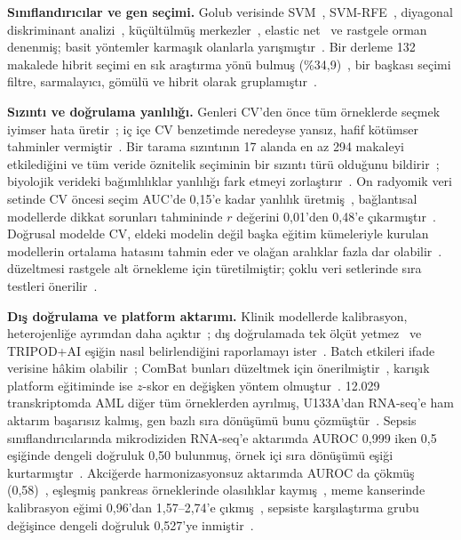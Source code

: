 \documentclass[conference]{IEEEtran}
\begin{document}
\textbf{Sınıflandırıcılar ve gen seçimi.} Golub verisinde SVM~\cite{furey2000}, SVM-RFE~\cite{guyon2002},
diyagonal diskriminant analizi~\cite{dudoit2002}, küçültülmüş merkezler~\cite{tibshirani2002}, elastic
net~\cite{zou2005} ve rastgele orman~\cite{diazuriarte2006} denenmiş; basit yöntemler karmaşık
olanlarla yarışmıştır~\cite{dudoit2002}. Bir derleme 132 makalede hibrit seçimi en sık araştırma yönü
bulmuş (\%34,9)~\cite{alhenawi2022}, bir başkası seçimi filtre, sarmalayıcı, gömülü ve hibrit olarak
gruplamıştır~\cite{alharbi2023}.

\textbf{Sızıntı ve doğrulama yanlılığı.} Genleri CV'den önce tüm örneklerde seçmek iyimser hata
üretir~\cite{ambroise2002}; iç içe CV benzetimde neredeyse yansız, hafif kötümser tahminler
vermiştir~\cite{varma2006}. Bir tarama sızıntının 17 alanda en az 294 makaleyi etkilediğini ve tüm
veride öznitelik seçiminin bir sızıntı türü olduğunu bildirir~\cite{kapoor2023}; biyolojik verideki
bağımlılıklar yanlılığı fark etmeyi zorlaştırır~\cite{whalen2022,bernett2024}. On radyomik veri setinde
CV öncesi seçim AUC'de 0,15'e kadar yanlılık üretmiş~\cite{demircioglu2021}, bağlantısal modellerde
dikkat sorunları tahmininde $r$ değerini 0,01'den 0,48'e çıkarmıştır~\cite{rosenblatt2024}. Doğrusal
modelde CV, eldeki modelin değil başka eğitim kümeleriyle kurulan modellerin ortalama hatasını tahmin
eder ve olağan aralıklar fazla dar olabilir~\cite{bates2024}. \cite{nadeau2003} düzeltmesi rastgele alt
örnekleme için türetilmiştir; çoklu veri setlerinde sıra testleri önerilir~\cite{demsar2006}.

\textbf{Dış doğrulama ve platform aktarımı.} Klinik modellerde kalibrasyon, heterojenliğe ayrımdan daha
açıktır~\cite{vancalster2023}; dış doğrulamada tek ölçüt yetmez~\cite{collins2024part1,riley2024part2}
ve TRIPOD+AI eşiğin nasıl belirlendiğini raporlamayı ister~\cite{collins2024tripod}. Batch etkileri
ifade verisine hâkim olabilir~\cite{leek2010}; ComBat bunları düzeltmek için önerilmiştir~\cite{johnson2007},
karışık platform eğitiminde ise $z$-skor en değişken yöntem olmuştur~\cite{foltz2023}. 12.029
transkriptomda AML diğer tüm örneklerden ayrılmış, U133A'dan RNA-seq'e ham aktarım başarısız kalmış,
gen bazlı sıra dönüşümü bunu çözmüştür~\cite{warnatherresthal2020}. Sepsis sınıflandırıcılarında
mikrodiziden RNA-seq'e aktarımda AUROC 0,999 iken 0,5 eşiğinde dengeli doğruluk 0,50 bulunmuş, örnek içi
sıra dönüşümü eşiği kurtarmıştır~\cite{zheng2026}. Akciğerde harmonizasyonsuz aktarımda AUROC da çökmüş
(0,58)~\cite{kervanci2026}, eşleşmiş pankreas örneklerinde olasılıklar kaymış~\cite{lee2025}, meme
kanserinde kalibrasyon eğimi 0,96'dan 1,57--2,74'e çıkmış~\cite{botan2026}, sepsiste karşılaştırma grubu
değişince dengeli doğruluk 0,527'ye inmiştir~\cite{kolev2026}.
\end{document}
